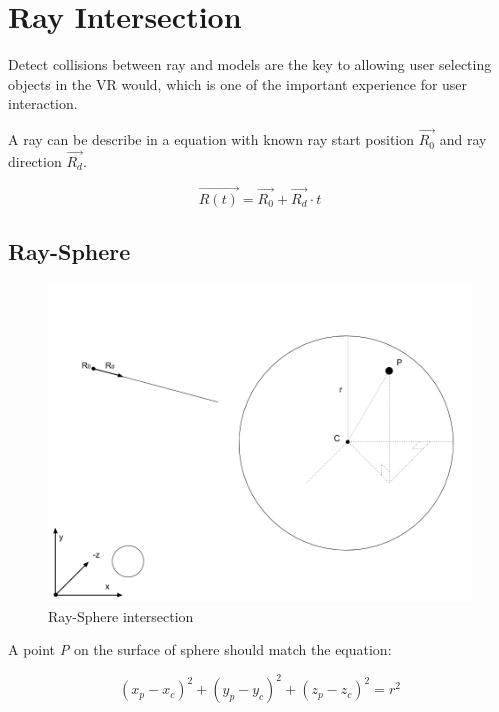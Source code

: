 \section{Ray Intersection}

Detect collisions between ray and models are the key to allowing user selecting objects in the VR would, which is one of the important experience for user interaction.

A ray can be describe in a equation with known ray start position \emph{$\overrightarrow{R_0}$} and ray direction \emph{$\overrightarrow{R_d}$}.

\begin{equation}
\label{equ:ray-t}
\overrightarrow{R(t)} = \overrightarrow{R_0} + \overrightarrow{R_d} \cdot t
\end{equation}

\subsection{Ray-Sphere}
\label{section:ray-sphere}

\begin{figure}[H]
\caption{Ray-Sphere intersection}
\label{fig:ray-sphere}
\centering
\includegraphics[width=\linewidth]{Figures/ray-sphere-intersection.png}
\decoRule
\end{figure}

A point \emph{P} on the surface of sphere should match the equation:

\begin{equation}
\label{equ:sphere-surface}
(x_p - x_c)^2 + (y_p - y_c)^2 + (z_p - z_c)^2 = r^2
\end{equation}

